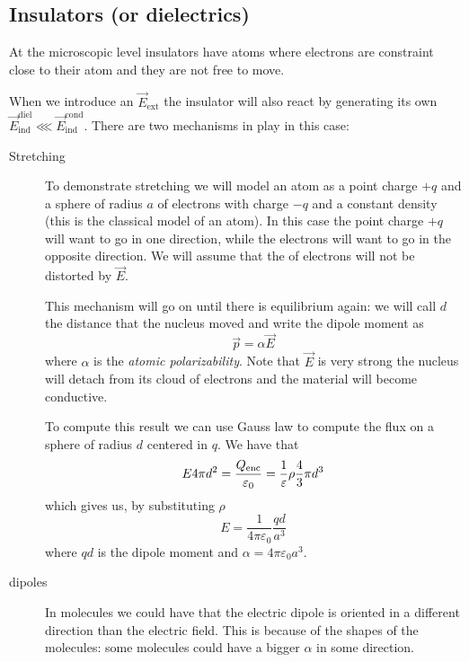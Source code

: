 \documentclass[12pt]{extarticle}
\begin{document}
\subsection{Insulators (or dielectrics)}

At the microscopic level insulators have atoms where electrons are constraint close to their atom and they are not free to move.

When we introduce an $\vec E_\text{ext}$ the insulator will also react by generating its own $\vec E_\text{ind}^\text{diel} \lll \vec E^\text{cond}_\text{ind}$.
There are two mechanisms in play in this case:
\begin{description}
	\item[Stretching]
	      To demonstrate stretching we will model an atom as a point charge $+q$ and a sphere of radius $a$ of electrons with charge $-q$ and a constant density (this is the classical model of an atom).
	      In this case the point charge $+q$ will want to go in one direction, while the electrons will want to go in the opposite direction.
	      We will assume that the  of electrons will not be distorted by $\vec E$.

	      This mechanism will go on until there is equilibrium again:
	      we will call $d$ the distance that the nucleus moved and write the dipole moment as
	      \begin{equation}
		      \vec p = \alpha \vec E
	      \end{equation}
	      where $\alpha$ is the \emph{atomic polarizability}.
	      Note that $\vec E$ is very strong the nucleus will detach from its cloud of electrons and the material will become conductive.

	      To compute this result we can use Gauss law to compute the flux on a sphere of radius $d$ centered in $q$.
	      We have that
	      \begin{equation}
		      E 4 \pi d^2 = \frac{Q_\text{enc}}{\varepsilon_0} = \frac{1}{\varepsilon} \rho \frac{4}{3} \pi d^3
	      \end{equation}
	      which gives us, by substituting $\rho$
	      \begin{equation}
		      E = \frac{1}{4 \pi \varepsilon_0}\frac{qd}{a^3}
	      \end{equation}
	      where $qd$ is the dipole moment and $\alpha = 4 \pi \varepsilon_0 a^3$.
	\item[ dipoles]
	      In molecules we could have that the electric dipole is oriented in a different direction than the electric field.
	      This is because of the shapes of the molecules: some molecules could have a bigger $\alpha$ in some direction.


\end{description}
\end{document}
